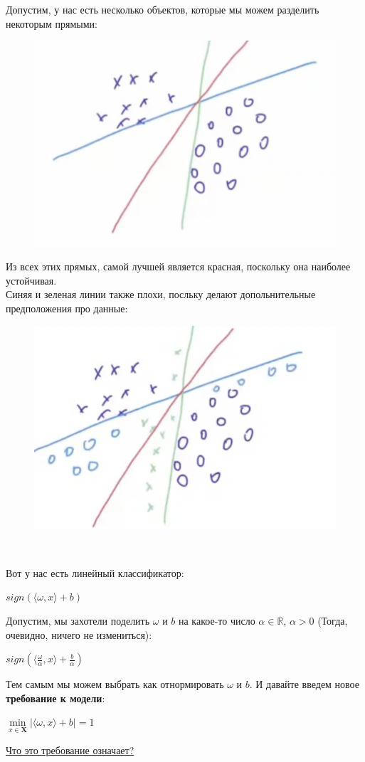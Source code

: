         Допустим, у нас есть несколько объектов, которые мы можем разделить некоторым прямыми:
        \begin{figure}[H]
            \centering
            \includegraphics[width=0.35 \textwidth]{images/7lecture/random_sample.png}
        \end{figure}
        Из всех этих прямых, самой лучшей является красная, поскольку она наиболее устойчивая.\\

        Синяя и зеленая линии также плохи, посльку делают допольнительные предположения про данные:
        \begin{figure}[H]
            \centering
            \includegraphics[width=0.35 \textwidth]{images/7lecture/random_sample2.png}
        \end{figure}
        \\


        Вот у нас есть линейный классификатор:
        \begin{center}
            $sign(\langle \omega, x\rangle + b)$
        \end{center}
        Допустим, мы захотели поделить $\omega$ и $b$ на какое-то число $\alpha \in \mathbb{R}$, $\alpha > 0$ (Тогда, очевидно, ничего не измениться):
        \begin{center}
            $sign(\langle \frac{\omega}{\alpha}, x\rangle + \frac{b}{\alpha})$
        \end{center}
        Тем самым мы можем выбрать как отнормировать $\omega$ и $b$. И давайте введем новое \textbf{требование к модели}:
        \begin{center}
            \large$\min\limits_{x \in \mathbf{X}}|\langle \omega, x\rangle + b| = 1$
        \end{center}
        \underline{Что это требование означает?}\\

